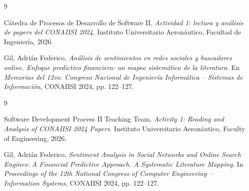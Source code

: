 
\ifES
\begin{thebibliography}{9}

Cátedra de Procesos de Desarrollo de Software II,
\textit{Actividad 1: lectura y análisis de papers del CONAIISI 2024}.
Instituto Universitario Aeronáutico, Facultad de Ingeniería, 2026.

Gil, Adrián Federico,
\textit{Análisis de sentimientos en redes sociales y buscadores online. Enfoque predictivo financiero: un mapeo sistemático de la literatura}.
En \textit{Memorias del 12vo. Congreso Nacional de Ingeniería Informática -- Sistemas de Información}, CONAIISI 2024, pp. 122--127.

\end{thebibliography}

\else
\begin{thebibliography}{9}

Software Development Process II Teaching Team,
\textit{Activity 1: Reading and Analysis of CONAIISI 2024 Papers}.
Instituto Universitario Aeronáutico, Faculty of Engineering, 2026.

Gil, Adrián Federico,
\textit{Sentiment Analysis in Social Networks and Online Search Engines: A Financial Predictive Approach. A Systematic Literature Mapping}.
In \textit{Proceedings of the 12th National Congress of Computer Engineering -- Information Systems}, CONAIISI 2024, pp. 122--127.

\end{thebibliography}
\fi